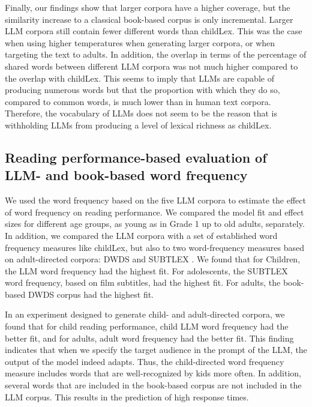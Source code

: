 \documentclass[doc, a4paper]{apa7}
\begin{document}
Finally, our findings show that larger corpora have a higher coverage, but the similarity increase to a classical book-based corpus is only incremental. Larger LLM corpora still contain fewer different words than childLex. This was the case when using higher temperatures when generating larger corpora, or when targeting the text to adults. In addition, the overlap in terms of the percentage of shared words between different LLM corpora was not much higher compared to the overlap with childLex. This seems to imply that LLMs are capable of producing numerous words but that the proportion with which they do so, compared to common words, is much lower than in human text corpora. Therefore, the vocabulary of LLMs does not seem to be the reason that is withholding LLMs from producing a level of lexical richness as childLex. 




\subsection*{Reading performance-based evaluation of LLM- and book-based word frequency}

We used the word frequency based on the five LLM corpora to estimate the effect of word frequency on reading performance. We compared the model fit and effect sizes for different age groups, as young as in Grade 1 up to old adults, separately. In addition, we compared the LLM corpora with a set of established word frequency measures like childLex, but also to two word-frequency measures based on adult-directed corpora: DWDS \citep{heister_dlexdb_2011} and SUBTLEX \citep{brysbaert_word_2011}. We found that for Children, the LLM word frequency had the highest fit. For adolescents, the SUBTLEX word frequency, based on film subtitles, had the highest fit. For adults, the book-based DWDS corpus had the highest fit. 

In an experiment designed to generate child- and adult-directed corpora, we found that for child reading performance, child LLM word frequency had the better fit, and for adults, adult word frequency had the better fit. This finding indicates that when we specify the target audience in the prompt of the LLM, the output of the model indeed adapts. Thus, the child-directed word frequency measure includes words that are well-recognized by kids more often. In addition, several words that are included in the book-based corpus are not included in the LLM corpus. This results in the prediction of high response times. 
\end{document}
